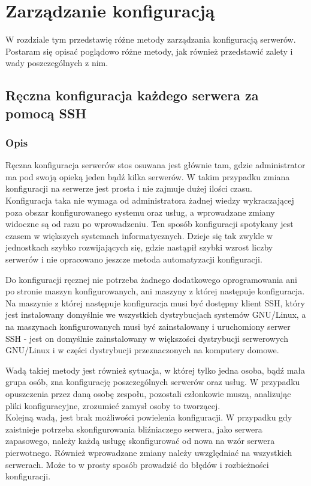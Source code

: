 \chapter{Zarządzanie konfiguracją}
W rozdziale tym przedstawię różne metody zarządzania konfiguracją serwerów. Postaram się opisać poglądowo różne metody, jak również przedstawić zalety i wady poszczególnych z nim.
\section{Ręczna konfiguracja każdego serwera za pomocą SSH}
\subsection{Opis}
Ręczna konfiguracja serwerów stos osuwana jest głównie tam, gdzie administrator ma pod swoją opieką jeden bądź kilka serwerów. W takim przypadku zmiana konfiguracji na serwerze jest prosta i nie zajmuje dużej ilości czasu.\\
Konfiguracja taka nie wymaga od administratora żadnej wiedzy wykraczającej poza obszar konfigurowanego systemu oraz usług, a wprowadzane zmiany widoczne są od razu po wprowadzeniu.
Ten sposób konfiguracji spotykany jest czasem w większych systemach informatycznych.
Dzieje się tak zwykle w jednostkach szybko rozwijających się, gdzie nastąpił szybki wzrost liczby serwerów i nie opracowano jeszcze metoda automatyzacji konfiguracji.

Do konfiguracji ręcznej nie potrzeba żadnego dodatkowego oprogramowania ani po stronie maszyn konfigurowanych, ani maszyny z której następuje konfiguracja.
Na maszynie z której następuje konfiguracja musi być dostępny klient SSH, który jest instalowany domyślnie we wszystkich dystrybucjach systemów GNU/Linux, a na maszynach konfigurowanych musi być zainstalowany i uruchomiony serwer SSH - jest on domyślnie zainstalowany w większości dystrybucji serwerowych GNU/Linux i w części dystrybucji przeznaczonych na komputery domowe.

Wadą takiej metody jest również sytuacja, w której tylko jedna osoba, bądź mała grupa osób, zna konfigurację poszczególnych serwerów oraz usług.
W przypadku opuszczenia przez daną osobę zespołu, pozostali członkowie muszą, analizując pliki konfiguracyjne, zrozumieć zamysł osoby to tworzącej.\\
Kolejną wadą, jest brak możliwości powielenia konfiguracji.
W przypadku gdy zaistnieje potrzeba skonfigurowania bliźniaczego serwera, jako serwera zapasowego, należy każdą usługę skonfigurować od nowa na wzór serwera pierwotnego. Również wprowadzane zmiany należy uwzględniać na wszystkich serwerach.
Może to w prosty sposób prowadzić do błędów i rozbieżności konfiguracji.
